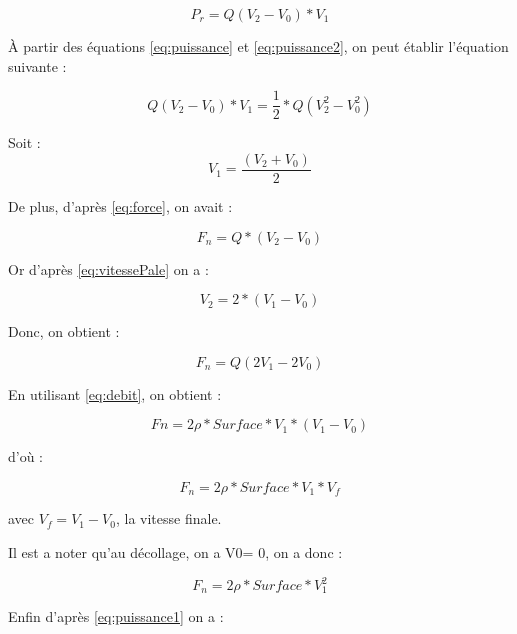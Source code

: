 \documentclass[a4paper,10pt]{report}
\begin{document}
	\begin{equation}
	  \label{eq:puissance2}
	  P_{r} = Q(V_{2}-V_{0})*V_{1} 
	\end{equation}
	
	À partir des équations \ref{eq:puissance} et \ref{eq:puissance2}, on 
peut établir l'équation suivante : 
	
	\begin{equation}
	  Q(V_{2} - V_{0})*V_{1} = \frac{1}{2} * Q (V_{2}^{2}-V_{0}^{2})
	\end{equation}
	
	Soit :
	\begin{equation}
	  \label{eq:vitessePale}
	  V_{1} = \frac{(V_{2} + V_{0})}{2} 
	\end{equation}
	
	De plus, d'après \ref{eq:force}, on avait : 
	
	\begin{equation}
	  F_{n} =  Q*(V_{2} - V_{0}) 
	\end{equation}
	
	Or d'après \ref{eq:vitessePale} on a : 
	
	\begin{equation}
	  V_{2} = 2*(V_{1} - V_{0})
	\end{equation}
	
	Donc, on obtient :
	
	\begin{equation}
	  F_{n} = Q(2V_{1} - 2V_{0})
	\end{equation}
	
	En utilisant \ref{eq:debit}, on obtient :
	
	\begin{equation}
	  Fn = 2 \rho * Surface * V_{1} * (V_{1} - V_{0})
	\end{equation}

	d'où :
	
	\begin{equation}
	  \label{eqForce}
	  F_{n} =  2 \rho * Surface *V_{1} * V_{f}
	\end{equation}
	
	avec $V_{f} = V_{1} - V_{0}$, la vitesse finale.
	
	Il est a noter qu'au décollage, on a V0= 0, on a donc :
	
	\begin{equation}
	  \label{eq:decollage}
	  F_{n} =  2 \rho * Surface * V_{1}^{2}
	\end{equation}
	
	Enfin d'après \ref{eq:puissance1} on a :
	
\end{document}

